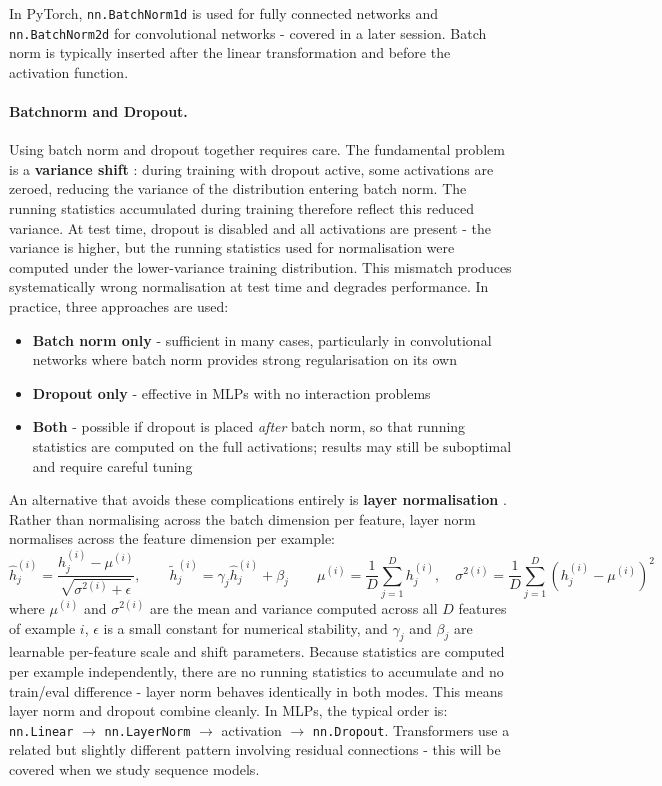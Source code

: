In PyTorch, \texttt{nn.BatchNorm1d} is used for fully connected networks and \texttt{nn.BatchNorm2d} for convolutional networks - covered in a later session. Batch norm is typically inserted after the linear transformation and before the activation function.

\paragraph{Batchnorm and Dropout.}
Using batch norm and dropout together requires care. The fundamental problem is a \textbf{variance shift} \parencite{Li2019}: during training with dropout active, some activations are zeroed, reducing the variance of the distribution entering batch norm. The running statistics accumulated during training therefore reflect this reduced variance. At test time, dropout is disabled and all activations are present - the variance is higher, but the running statistics used for normalisation were computed under the lower-variance training distribution. This mismatch produces systematically wrong normalisation at test time and degrades performance. In practice, three approaches are used:
\begin{itemize}
    \item \textbf{Batch norm only} - sufficient in many cases, particularly in convolutional networks where batch norm provides strong regularisation on its own
    \item \textbf{Dropout only} - effective in MLPs with no interaction problems
    \item \textbf{Both} - possible if dropout is placed \emph{after} batch norm, so that running statistics are computed on the full activations; results may still be suboptimal and require careful tuning
\end{itemize}

An alternative that avoids these complications entirely is \textbf{layer normalisation} \parencite{Ba2016}. Rather than normalising across the batch dimension per feature, layer norm normalises across the feature dimension per example:
\begin{equation}
    \hat{h}_j^{(i)} = \frac{h_j^{(i)} - \mu^{(i)}}{\sqrt{\sigma^{2(i)} + \epsilon}},
    \qquad
    \tilde{h}_j^{(i)} = \gamma_j \hat{h}_j^{(i)} + \beta_j
    \qquad
    \mu^{(i)} = \frac{1}{D}\sum_{j=1}^{D} h_j^{(i)}, \quad 
    \sigma^{2(i)} = \frac{1}{D}\sum_{j=1}^{D} (h_j^{(i)} - \mu^{(i)})^2
\end{equation}
where $\mu^{(i)}$ and $\sigma^{2(i)}$ are the mean and variance computed across all $D$ features of example $i$, $\epsilon$ is a small constant for numerical stability, and $\gamma_j$ and $\beta_j$ are learnable per-feature scale and shift parameters. Because statistics are computed per example independently, there are no running statistics to accumulate and no train/eval difference - layer norm behaves identically in both modes. This means layer norm and dropout combine cleanly. In MLPs, the typical order is: \texttt{nn.Linear} $\to$ \texttt{nn.LayerNorm} $\to$ activation $\to$ \texttt{nn.Dropout}. Transformers use a related but slightly different pattern involving residual connections - this will be covered when we study sequence models. 

